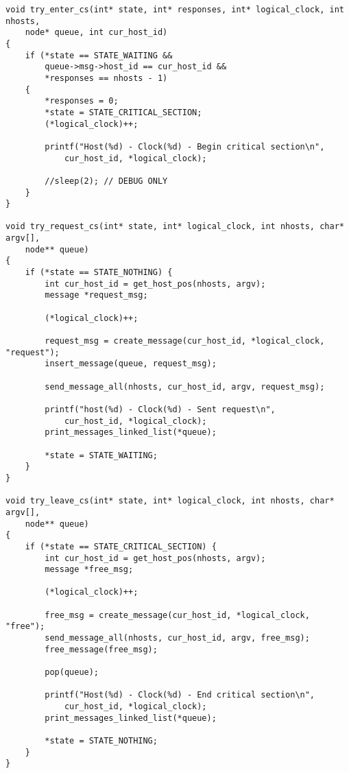 \begin{lstlisting}[caption={Fonctions de mise à jour d'état}]
void try_enter_cs(int* state, int* responses, int* logical_clock, int nhosts,
    node* queue, int cur_host_id)
{
    if (*state == STATE_WAITING &&
        queue->msg->host_id == cur_host_id &&
        *responses == nhosts - 1)
    {
        *responses = 0;
        *state = STATE_CRITICAL_SECTION;
        (*logical_clock)++;

        printf("Host(%d) - Clock(%d) - Begin critical section\n",
            cur_host_id, *logical_clock);

        //sleep(2); // DEBUG ONLY
    }
}

void try_request_cs(int* state, int* logical_clock, int nhosts, char* argv[],
    node** queue)
{
    if (*state == STATE_NOTHING) {
        int cur_host_id = get_host_pos(nhosts, argv);
        message *request_msg;

        (*logical_clock)++;

        request_msg = create_message(cur_host_id, *logical_clock, "request");
        insert_message(queue, request_msg);

        send_message_all(nhosts, cur_host_id, argv, request_msg);

        printf("host(%d) - Clock(%d) - Sent request\n",
            cur_host_id, *logical_clock);
        print_messages_linked_list(*queue);

        *state = STATE_WAITING;
    }
}

void try_leave_cs(int* state, int* logical_clock, int nhosts, char* argv[],
    node** queue)
{
    if (*state == STATE_CRITICAL_SECTION) {
        int cur_host_id = get_host_pos(nhosts, argv);
        message *free_msg;

        (*logical_clock)++;

        free_msg = create_message(cur_host_id, *logical_clock, "free");
        send_message_all(nhosts, cur_host_id, argv, free_msg);
        free_message(free_msg);

        pop(queue);

        printf("Host(%d) - Clock(%d) - End critical section\n",
            cur_host_id, *logical_clock);
        print_messages_linked_list(*queue);

        *state = STATE_NOTHING;
    }
}
\end{lstlisting}
